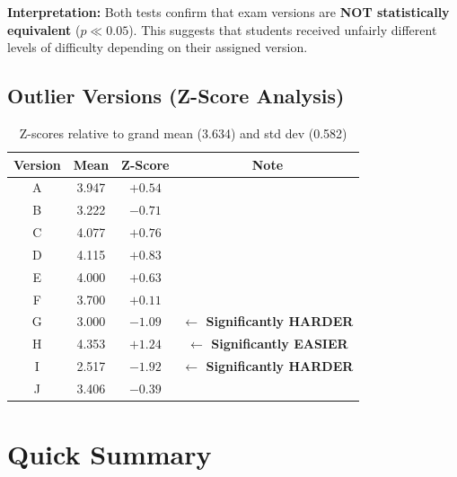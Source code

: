\documentclass[12pt, a4paper]{article}
\begin{document}
	\begin{tcolorbox}[colback=danger!5, colframe=danger, arc=3pt, boxrule=0.8pt]
		\textbf{Interpretation:} Both tests confirm that exam versions are \textbf{NOT statistically
			equivalent} ($p \ll 0.05$). This suggests that students received unfairly different levels
		of difficulty depending on their assigned version.
	\end{tcolorbox}
	
	\subsection{Outlier Versions (Z-Score Analysis)}
	
	\begin{table}[H]
		\centering
		\caption{Z-scores relative to grand mean (3.634) and std dev (0.582)}
		\renewcommand{\arraystretch}{1.4}
		\begin{tabular}{cccc}
			\toprule
			\rowcolor{primary}
			\color{white}\textbf{Version} &
			\color{white}\textbf{Mean} &
			\color{white}\textbf{Z-Score} &
			\color{white}\textbf{Note} \\
			\midrule
			\rowcolor{rowA}          A & 3.947 & $+0.54$ & \\
			\rowcolor{rowB}          B & 3.222 & $-0.71$ & \\
			\rowcolor{rowA}          C & 4.077 & $+0.76$ & \\
			\rowcolor{rowB}          D & 4.115 & $+0.83$ & \\
			\rowcolor{rowA}          E & 4.000 & $+0.63$ & \\
			\rowcolor{rowB}          F & 3.700 & $+0.11$ & \\
			\rowcolor{warning!20}    G & 3.000 & $-1.09$ &
			\textcolor{warning!80!black}{\textbf{$\leftarrow$ Significantly HARDER}} \\
			\rowcolor{success!15}    H & 4.353 & $+1.24$ &
			\textcolor{success}{\textbf{$\leftarrow$ Significantly EASIER}} \\
			\rowcolor{danger!15}     I & 2.517 & $-1.92$ &
			\textcolor{danger}{\textbf{$\leftarrow$ Significantly HARDER}} \\
			\rowcolor{rowB}          J & 3.406 & $-0.39$ & \\
			\bottomrule
		\end{tabular}
	\end{table}
	
	\section{Quick Summary}
	
\end{document}
